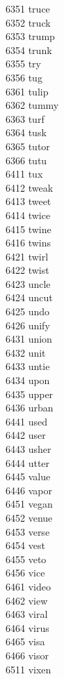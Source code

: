 6351 truce \\
6352 truck \\
6353 trump \\
6354 trunk \\
6355 try \\
6356 tug \\
6361 tulip \\
6362 tummy \\
6363 turf \\
6364 tusk \\
6365 tutor \\
6366 tutu \\
6411 tux \\
6412 tweak \\
6413 tweet \\
6414 twice \\
6415 twine \\
6416 twins \\
6421 twirl \\
6422 twist \\
6423 uncle \\
6424 uncut \\
6425 undo \\
6426 unify \\
6431 union \\
6432 unit \\
6433 untie \\
6434 upon \\
6435 upper \\
6436 urban \\
6441 used \\
6442 user \\
6443 usher \\
6444 utter \\
6445 value \\
6446 vapor \\
6451 vegan \\
6452 venue \\
6453 verse \\
6454 vest \\
6455 veto \\
6456 vice \\
6461 video \\
6462 view \\
6463 viral \\
6464 virus \\
6465 visa \\
6466 visor \\
6511 vixen \\
